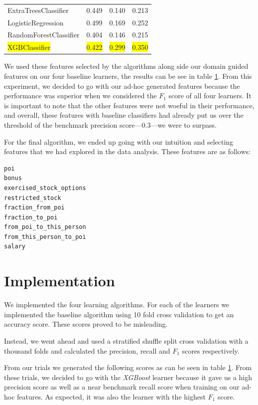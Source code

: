 \documentclass[twoside,openright,titlepage,numbers=noenddot,headinclude,%
               footinclude=true,cleardoublepage=empty,abstractoff,BCOR=5mm,%
               paper=a4,fontsize=11pt,ngerman,american]{scrreprt}
\numberwithin{theorem}{chapter}
\numberwithin{definition}{chapter}
\numberwithin{algorithm}{chapter}
\numberwithin{figure}{chapter}
\numberwithin{table}{chapter}
\numberwithin{equation}{chapter}
\newcommand{\hilight}[1]{\colorbox{yellow}{#1}}
\begin{document}
\begin{table}[!htbp]
\begin{tabular}{|p{6cm}|p{1.5cm}|p{1.5cm}|p{1.5cm}|}
ExtraTreesClassifier     &  0.449       &  0.140     &  0.213     \\ 
LogisticRegression       &  0.499       &  0.169     &  0.252     \\ 
RandomForestClassifier   &  0.404       &  0.146     &  0.215     \\ 
\hilight{XGBClassifier}  &  \hilight{0.422} &  \hilight{0.299} &  \hilight{0.350}     \\ 

\hline %

\end{tabular}
\label{tableBenchMarkScores}
\end{table}

We used these features selected by the algorithms along side our domain guided features on our four baseline learners, the results can be see in table \ref{tableBenchMarkScores}. From this experiment, we decided to go with our ad-hoc generated features because the performance was superior when we considered the $F_1$ score of all four learners. It is important to note that the other features were not woeful in their performance, and overall, these features with baseline classifiers had already put us over the threshold of the benchmark precision score---0.3---we were to surpass.

For the final algorithm, we ended up going with our intuition and selecting features that we had explored in the data analysis. These features are as follows: 
\begin{verbatim}
poi
bonus
exercised_stock_options
restricted_stock
fraction_from_poi
fraction_to_poi
from_poi_to_this_person
from_this_person_to_poi
salary
\end{verbatim}


\section*{Implementation}

We implemented the four learning algorithms. For each of the learners we implemented the baseline algorithm using 10 fold cross validation to get an accuracy score. These scores proved to be misleading. 

Instead, we went ahead and used a stratified shuffle split cross validation with a thousand folds and calculated the precision, recall and $F_1$ scores respectively.

From our trials we generated the following scores as can be seen in table \ref{tableBenchMarkScores}. From these trials, we decided to go with the \textit{XGBoost} learner because it gave us a high precision score as well as a near benchmark recall score when training on our ad-hoc features. As expected, it was also the learner with the highest $F_1$ score.
\end{document}
